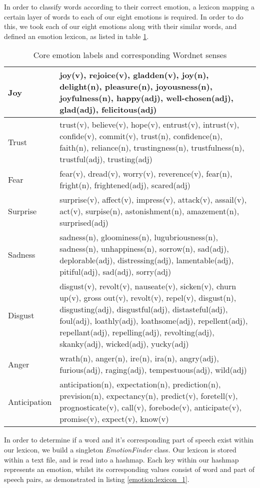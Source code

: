 In order to classify words according to their correct emotion, a lexicon mapping a certain layer of words to each of our eight emotions is required. In order to do this, we took each of our eight emotions along with their similar words, and defined an emotion lexicon, as listed in table \ref{table:emotion}.

\begin{longtable}{|l|p{3.7in}|}
	\caption{Core emotion labels and corresponding Wordnet senses} \label{table:emotion} \\
	\hline
		Joy & joy(v), rejoice(v), gladden(v), joy(n), delight(n), pleasure(n), joyousness(n), joyfulness(n), happy(adj), well-chosen(adj), glad(adj), felicitous(adj) \\
		\hline
		Trust & trust(v), believe(v), hope(v), entrust(v), intrust(v), confide(v), commit(v), trust(n), confidence(n), faith(n), reliance(n), trustingness(n), trustfulness(n), trustful(adj), trusting(adj) \\
		\hline
		Fear & fear(v), dread(v), worry(v), reverence(v), fear(n), fright(n),  frightened(adj), scared(adj) \\
		\hline
		Surprise & surprise(v), affect(v), impress(v), attack(v), assail(v), act(v), surpise(n), astonishment(n), amazement(n), surprised(adj) \\
		\hline
		Sadness & sadness(n), gloominess(n), lugubriousness(n), sadness(n), unhappiness(n), sorrow(n), sad(adj), deplorable(adj), distressing(adj), lamentable(adj), pitiful(adj), sad(adj), sorry(adj) \\
		\hline
		Disgust & disgust(v), revolt(v), nauseate(v), sicken(v), churn up(v), gross out(v), revolt(v), repel(v), disgust(n), disgusting(adj), disgustful(adj), distasteful(adj), foul(adj), loathly(adj), loathsome(adj), repellent(adj), repellant(adj), repelling(adj), revolting(adj), skanky(adj), wicked(adj), yucky(adj) \\
		\hline
		Anger & wrath(n), anger(n), ire(n), ira(n), angry(adj), furious(adj), raging(adj), tempestuous(adj), wild(adj) \\
		\hline
		Anticipation & anticipation(n), expectation(n), prediction(n), prevision(n), expectancy(n), predict(v), foretell(v), prognosticate(v), call(v), forebode(v), anticipate(v), promise(v), expect(v), know(v) \\
	\hline
\end{longtable}

In order to determine if a word and it's corresponding part of speech exist within our lexicon, we build a singleton \emph{EmotionFinder} class. Our lexicon is stored within a text file, and is read into a hashmap. Each key within our hashmap represents an emotion, whilst its corresponding values consist of word and part of speech pairs, as demonstrated in listing \ref{emotion:lexicon_1}.

